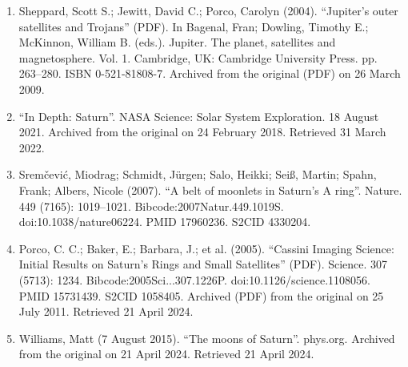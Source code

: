 \begin{enumerate}
\item Sheppard, Scott S.; Jewitt, David C.; Porco, Carolyn (2004). ``Jupiter's outer satellites and Trojans'' (PDF). In Bagenal, Fran; Dowling, Timothy E.; McKinnon, William B. (eds.). Jupiter. The planet, satellites and magnetosphere. Vol. 1. Cambridge, UK: Cambridge University Press. pp. 263–280. ISBN 0-521-81808-7. Archived from the original (PDF) on 26 March 2009.
\item ``In Depth: Saturn''. NASA Science: Solar System Exploration. 18 August 2021. Archived from the original on 24 February 2018. Retrieved 31 March 2022.
\item Sremčević, Miodrag; Schmidt, Jürgen; Salo, Heikki; Seiß, Martin; Spahn, Frank; Albers, Nicole (2007). ``A belt of moonlets in Saturn's A ring''. Nature. 449 (7165): 1019–1021. Bibcode:2007Natur.449.1019S. doi:10.1038/nature06224. PMID 17960236. S2CID 4330204.
\item Porco, C. C.; Baker, E.; Barbara, J.; et al. (2005). ``Cassini Imaging Science: Initial Results on Saturn's Rings and Small Satellites'' (PDF). Science. 307 (5713): 1234. Bibcode:2005Sci...307.1226P. doi:10.1126/science.1108056. PMID 15731439. S2CID 1058405. Archived (PDF) from the original on 25 July 2011. Retrieved 21 April 2024.
\item Williams, Matt (7 August 2015). ``The moons of Saturn''. phys.org. Archived from the original on 21 April 2024. Retrieved 21 April 2024.


\end{enumerate}